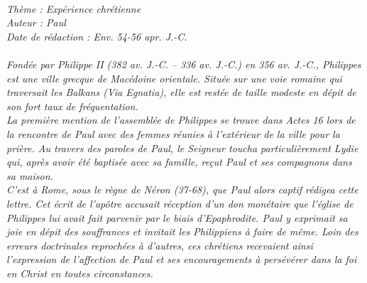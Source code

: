 \BFont
\noindent\hrulefill
\textit{
\bigskip
{\centering{}
\\Thème : Expérience chrétienne
\\Auteur : Paul
\\Date de rédaction : Env. 54-56 apr. J.-C.\\}
}
\textit{
\\Fondée par Philippe II (382 av. J.-C. – 336 av. J.-C.) en 356 av. J.-C., Philippes est une ville grecque de Macédoine orientale. Située sur une voie romaine qui traversait les Balkans (Via Egnatia), elle est restée de taille modeste en dépit de son fort taux de fréquentation.
\bigskip
\\La première mention de l’assemblée de Philippes se trouve dans Actes 16 lors de la rencontre de Paul avec  des femmes réunies à l’extérieur  de la ville pour la prière. Au travers des paroles de Paul, le Seigneur toucha particulièrement Lydie qui, après avoir été baptisée avec sa famille,  reçut Paul et ses compagnons dans sa maison.
\bigskip
\\C’est à Rome, sous le règne de Néron (37-68), que Paul alors captif rédigea cette lettre. Cet écrit de l’apôtre accusait réception d’un don monétaire que l’église de Philippes lui avait fait parvenir par le biais d’Epaphrodite. Paul y exprimait sa joie en dépit des souffrances et invitait les Philippiens à faire de même. Loin des erreurs doctrinales reprochées à d’autres, ces chrétiens recevaient ainsi l’expression de l’affection de Paul et ses encouragements à persévérer dans la foi en Christ en toutes circonstances.\bigskip
}
\par\nobreak\noindent\hrulefill
